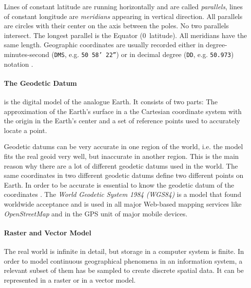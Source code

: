 Lines of constant latitude are running horizontally and are called \emph{parallels}, lines of constant longitude are \emph{meridians} appearing in vertical direction. All parallels are circles with their center on the axis between the poles. No two parallels intersect. The longest parallel is the Equator (0\degree~latitude). All meridians have the same length. Geographic coordinates are usually recorded either in degree-minutes-second (\texttt{DMS}, e.g. \texttt{50\degree~58' 22''}) or in decimal degree (\texttt{DD}, e.g. \texttt{50.973}) notation
\cite[pp. 30, 79]{bolstad2008gis}.


\paragraph{The Geodetic Datum} %
\label{par:geodetic_datum}

is the digital model of the analogue Earth. It consists of two parts: The approximation of the Earth's surface in a the Cartesian coordinate system with the origin in the Earth's center and a set of reference points used to accurately locate a point.

Geodetic datums can be very accurate in one region of the world, i.e. the model fits the real geoid very well, but inaccurate in another region. This is the main reason why there are a lot of different geodetic datums used in the world. The same coordinates in two different geodetic datums define two different points on Earth. In order to be accurate is essential to know the geodetic datum of the coordinates
\cite[p. 80]{bolstad2008gis}.
The \emph{World Geodetic System 1984 (WGS84)} is a model that found worldwide acceptance and is used in all major Web-based mapping services like \emph{OpenStreetMap} and in the GPS unit of major mobile devices.


\paragraph{Raster and Vector Model} %
\label{ssub:raster_vs_vector_model}

The real world is infinite in detail, but storage in a computer system is finite. In order to model continuous geographical phenomena in an information system, a relevant subset of them has be sampled to create discrete spatial data. It can be represented in a raster or in a vector model.

